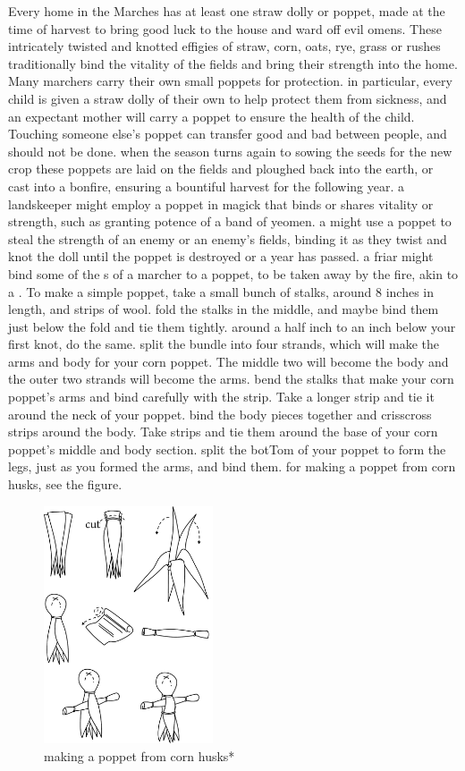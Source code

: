  Every home in the Marches has at least one straw dolly or poppet, made at the time of harvest to bring good luck to the house and ward off evil omens. These intricately twisted and knotted effigies of straw, corn, oats, rye, grass or rushes traditionally bind the vitality of the fields and bring their strength into the home. \localpar Many marchers carry their own small poppets for protection. in particular, every child is given a straw dolly of their own to help protect them from sickness, and an expectant mother will carry a poppet to ensure the health of the child. Touching someone else’s poppet can transfer good and bad between people, and should not be done. when the season turns again to sowing the seeds for the new crop these poppets are laid on the fields and ploughed back into the earth, or cast into a bonfire, ensuring a bountiful harvest for the following year. a landskeeper might employ a poppet in magick that binds or shares vitality or strength, such as granting potence of a band of yeomen. a  might use a poppet to steal the strength of an enemy or an enemy's fields, binding it as they twist and knot the doll until the poppet is destroyed or a year has passed. a friar might bind some of the s of a marcher to a poppet, to be taken away by the  fire, akin to a . \localpar To make a simple poppet, take a small bunch of stalks, around 8 inches in length, and strips of wool. fold the stalks in the middle, and maybe bind them just below the fold and tie them tightly. around a half inch to an inch below your first knot, do the same. split the bundle into four strands, which will make the arms and body for your corn poppet. The middle two will become the body and the outer two strands will become the arms. bend the stalks that make your corn poppet’s arms and bind carefully with the strip. Take a longer strip and tie it around the neck of your poppet. bind the body pieces together and crisscross strips around the body. Take strips and tie them around the base of your corn poppet’s middle and body section. split the botTom of your poppet to form the legs, just as you formed the arms, and bind them. for making a poppet from corn husks, see the figure.\begin{figure}\centering\includegraphics[width=5cm]{encyclopedia/poppet}\caption{making a poppet from corn husks*}\end{figure} \bigparagraphendtwiddle
